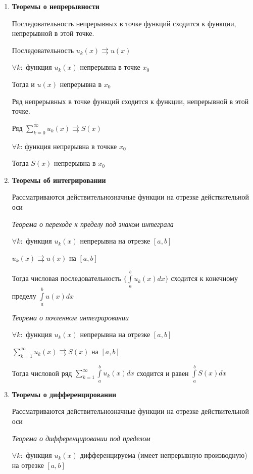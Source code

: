 \documentclass{article}
\begin{document}
	\begin{enumerate}
		\item {\bf Теоремы о непрерывности}
		
		Последовательность непрерывных в точке функций сходится к функции, непрерывной в этой точке.
		
		Последовательность $u_k(x) \rightrightarrows u(x)$
		
		$\forall k:$ функция $u_k(x)$ непрерывна в точке $x_0$
		
		Тогда и $u(x)$ непрерывна в $x_0$
		
		Ряд непрерывных в точке функций сходится к функции, непрерывной в этой точке.
		
		Ряд $\sum\limits_{k=0}^{\infty}u_k(x) \rightrightarrows S(x)$
		
		$\forall k$: функция непрерывна в точкке $x_0$
		
		Тогда $S(x)$ непрерывна в  $x_0$
		
		\item {\bf Теоремы об интегрировании}
		
		Рассматриваются действительнозначные функции на отрезке действительной оси
		
		{\it Теорема о переходе к пределу под знаком интеграла}
		
		$\forall k:$ функция $u_k(x)$ непрерывна на отрезке $[a, b]$
		
		$u_k(x) \rightrightarrows u(x)$ на $[a, b]$
		
		Тогда числовая последовательность $\{\int\limits_{a}^{b} u_k(x) dx\}$ сходится к конечному пределу $\int\limits_a^b u(x) dx$
		
		{\it Теорема о почленном интегрировании}
		
		$\forall k:$ функция $u_k(x)$ непрерывна на отрезке $[a, b]$
		
		$\sum\limits_{k=1}^{\infty}u_k(x) \rightrightarrows S(x)$ на $[a, b]$
		
		Тогда числовой ряд $\sum\limits_{k=1}^{\infty}\int\limits_{a}^{b} u_k(x) dx$ сходится и равен $\int\limits_a^b S(x) dx$
		
		\item {\bf Теоремы о дифференцировании}
		
		Рассматриваются действительнозначные функции на отрезке действительной оси
		
		{\it Теорема о дифференцировании под пределом}
		
		$\forall k:$ функция $u_k(x)$ дифференцируема (имеет непрерывную производную) на отрезке $[a, b]$
		

\end{enumerate}
\end{document}
